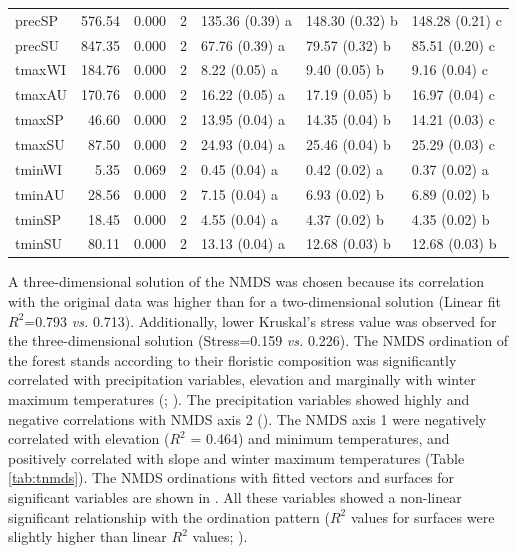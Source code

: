 \begin{table}
\begin{tabular}{lrrllll}
\hspace{1em}precSP & 576.54 & 0.000 & 2 & 135.36 (0.39) a & 148.30 (0.32) b & 148.28 (0.21) c\\
\hspace{1em}precSU & 847.35 & 0.000 & 2 & 67.76 (0.39) a & 79.57 (0.32) b & 85.51 (0.20) c\\
\hspace{1em}tmaxWI & 184.76 & 0.000 & 2 & 8.22 (0.05) a & 9.40 (0.05) b & 9.16 (0.04) c\\
\hspace{1em}tmaxAU & 170.76 & 0.000 & 2 & 16.22 (0.05) a & 17.19 (0.05) b & 16.97 (0.04) c\\
\hspace{1em}tmaxSP & 46.60 & 0.000 & 2 & 13.95 (0.04) a & 14.35 (0.04) b & 14.21 (0.03) c\\
\hspace{1em}tmaxSU & 87.50 & 0.000 & 2 & 24.93 (0.04) a & 25.46 (0.04) b & 25.29 (0.03) c\\
\hspace{1em}tminWI & 5.35 & 0.069 & 2 & 0.45 (0.04) a & 0.42 (0.02) a & 0.37 (0.02) a\\
\hspace{1em}tminAU & 28.56 & 0.000 & 2 & 7.15 (0.04) a & 6.93 (0.02) b & 6.89 (0.02) b\\
\hspace{1em}tminSP & 18.45 & 0.000 & 2 & 4.55 (0.04) a & 4.37 (0.02) b & 4.35 (0.02) b\\
\hspace{1em}tminSU & 80.11 & 0.000 & 2 & 13.13 (0.04) a & 12.68 (0.03) b & 12.68 (0.03) b\\
\bottomrule
\end{tabular}
\endgroup{}
\end{table}

A three-dimensional solution of the NMDS was chosen because its correlation with the original data was higher than for a two-dimensional solution (Linear fit \(R^2\)=0.793 \emph{vs.} 0.713). Additionally, lower Kruskal's stress value was observed for the three-dimensional solution (Stress=0.159 \emph{vs.} 0.226). The NMDS ordination of the forest stands according to their floristic composition was significantly correlated with precipitation variables, elevation and marginally with winter maximum temperatures (; ). The precipitation variables showed highly and negative correlations with NMDS axis 2 (). The NMDS axis 1 were negatively correlated with elevation (\(R^2\) = 0.464) and minimum temperatures, and positively correlated with slope and winter maximum temperatures (Table \ref{tab:tnmds}). The NMDS ordinations with fitted vectors and surfaces for significant variables are shown in . All these variables showed a non-linear significant relationship with the ordination pattern (\(R^2\) values for surfaces were slightly higher than linear \(R^2\) values; ).

